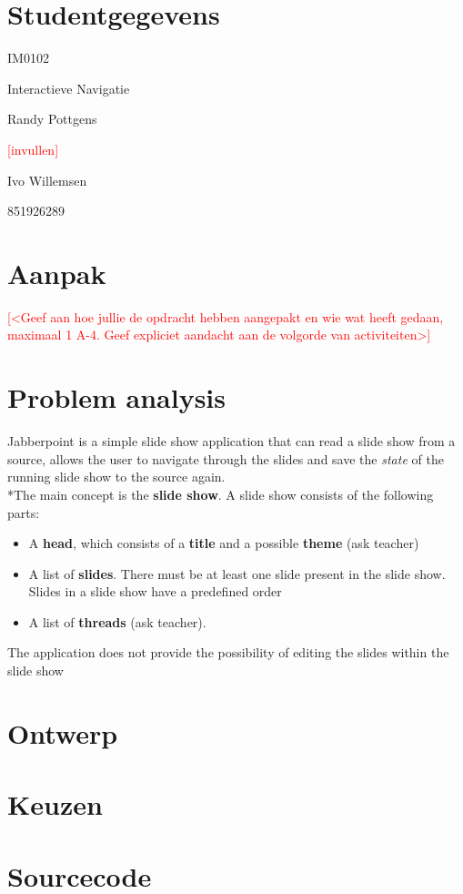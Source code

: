 \documentclass[a4paper]{article}
\newcommand{\todo}[1]{\textcolor{red}{[#1]}}
\begin{document}
\pagestyle{fancy}

\section*{Studentgegevens}
\begin{description}
	\item [Cursuscode] IM0102
	\item Interactieve Navigatie
	\item [Naam]Randy Pottgens
	\item [Studentnummer] \todo{invullen}
	\item [Naam]Ivo Willemsen
	\item [Studentnummer]851926289
\end{description}

\section*{Aanpak}
\todo{<Geef aan hoe jullie de opdracht hebben aangepakt en wie wat heeft gedaan, maximaal 1 A-4. Geef expliciet aandacht aan de volgorde van activiteiten>}



\section{Problem analysis}
Jabberpoint is a simple slide show application that can read a slide show from a source, allows the user to navigate through the slides and save the \textit{state} of the running slide show to the source again.
\\*The main concept is the \textbf{slide show}. A slide show consists of the following parts:
\begin{itemize}
\item A \textbf{head}, which consists of a \textbf{title} and a possible \textbf{theme} (ask teacher)
\item A list of \textbf{slides}. There must be at least one slide present in the slide show. Slides in a slide show have a predefined order
\item A list of \textbf{threads} (ask teacher). 
\end{itemize}
The application does not provide the possibility of editing the slides within the slide show


\section{Ontwerp}


\section{Keuzen}



\section{Sourcecode}
\end{document}

